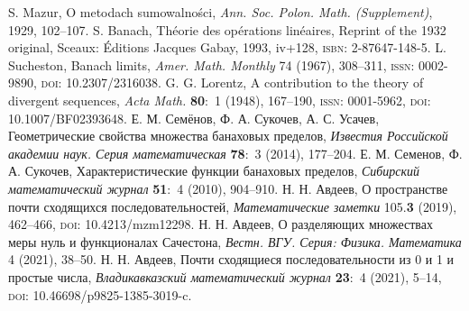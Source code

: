\documentclass[a4paper,14pt]{article}
\begin{document}
\small
\begin{thebibliography}{99}
	{}
	S. Mazur, O metodach sumowalno\'sci,
	\emph{Ann. Soc. Polon. Math. (Supplement)}, 1929, 102--107.
	{}
	S. Banach, Th\'eorie des op\'erations lin\'eaires, Reprint of the 1932 original, Sceaux: \'Editions Jacques Gabay,
	1993, iv+128, \textsc{isbn}: 2-87647-148-5.
	{}
	L. Sucheston, Banach limits, \emph{Amer. Math. Monthly} 74 (1967), 308--311, \textsc{issn}: 0002-9890,
	\textsc{doi}: {10.2307/2316038}.
	{}
	G. G. Lorentz, A contribution to the theory of divergent sequences, \emph{Acta Math.} \textbf{80}:~{1}
	(1948), 167--190, \textsc{issn}: 0001-5962, \textsc{doi}: {10.1007/BF02393648}.
	{}
	Е. М. Семёнов, Ф. А. Сукочев, А. С. Усачев, Геометрические свойства множества банаховых пределов,
	\emph{Известия Российской академии наук. Серия математическая} \textbf{78}:~{3} (2014), 177--204.
	{}
	Е. М. Семенов, Ф. А. Сукочев, Характеристические функции банаховых пределов, \emph{Сибирский
	математический журнал} \textbf{51}:~4 (2010), 904--910.
	{}
	Н. Н. Авдеев, О пространстве почти сходящихся последовательностей, \emph{Математические заметки}
	105.\textbf{3} (2019), 462--466, \textsc{doi}: {10.4213/mzm12298}.
	{}
	Н. Н. Авдеев, О разделяющих множествах меры нуль и функционалах Сачестона,
	\emph{Вестн. ВГУ. Серия: Физика. Математика} 4 (2021), 38--50.
	{}
	Н. Н. Авдеев, Почти сходящиеся последовательности из 0 и 1 и
	простые числа, \emph{Владикавказский математический журнал} {\bf 23}:~4 (2021), 5--14,
	\textsc{doi}: {10.46698/p9825-1385-3019-c}.
\end{thebibliography}
\normalsize
\end{document}
